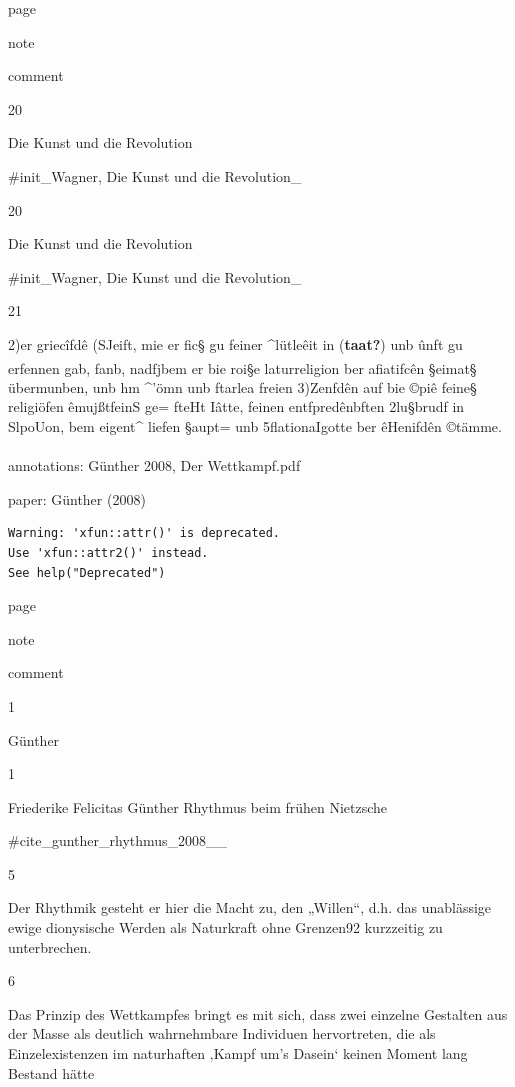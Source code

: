 \documentclass[
  letterpaper,
  DIV=11,
  numbers=noendperiod]{scrartcl}
\makeatletter
\let\oldparagraph\paragraph
\renewcommand{\paragraph}{
    \@ifstar
      \xxxParagraphStar
      \xxxParagraphNoStar
  }
\newcommand{\xxxParagraphStar}[1]{\oldparagraph*{#1}\mbox{}}
\newcommand{\xxxParagraphNoStar}[1]{\oldparagraph{#1}\mbox{}}
\makeatother
\begin{document}
page

note

comment

20

Die Kunst und die Revolution

\#init\_Wagner, Die Kunst und die Revolution\_

20

Die Kunst und die Revolution

\#init\_Wagner, Die Kunst und die Revolution\_

21

2)er griecîfdê (SJeift, mie er fic§ gu feiner \^{}lütleêit in
(\textbf{taat?}) unb ûnft gu erfennen gab, fanb, nadfjbem er bie roi§e
\textsuperscript{}laturreligion ber afiatifcên §eimat§ übermunben, unb
hm \^{}'ömn unb ftarlea freien 3)Zenfdên auf bie ©piê feine§ religiöfen
êmujßtfeinS ge= fteHt Iâtte, feinen entfpredênbften 2lu§brudf in
SlpoUon, bem eigent\^{} liefen §aupt= unb 5flationaIgotte ber êHenifdên
©tämme.

\paragraph{annotations: Günther 2008, Der
Wettkampf.pdf}\label{annotations-gunther-2008-der-wettkampf.pdf}

paper: Günther (2008)

\begin{verbatim}
Warning: 'xfun::attr()' is deprecated.
Use 'xfun::attr2()' instead.
See help("Deprecated")
\end{verbatim}

page

note

comment

1

Günther

1

Friederike Felicitas Günther Rhythmus beim frühen Nietzsche

\#cite\_gunther\_rhythmus\_2008\_\_

5

Der Rhythmik gesteht er hier die Macht zu, den „Willen``, d.h. das
unablässige ewige dionysische Werden als Naturkraft ohne Grenzen92
kurzzeitig zu unterbrechen.

6

Das Prinzip des Wettkampfes bringt es mit sich, dass zwei einzelne
Gestalten aus der Masse als deutlich wahrnehmbare Individuen
hervortreten, die als Einzelexistenzen im naturhaften ‚Kampf um's
Dasein` keinen Moment lang Bestand hätte
\end{document}
